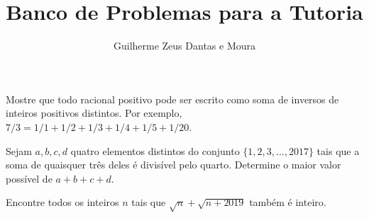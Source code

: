 \documentclass[10pt,a4paper]{scrartcl}
\title{Banco de Problemas para a Tutoria}
\author{Guilherme Zeus Dantas e Moura}
\begin{document}
	
	\zeustitle


	\begin{prob}
		Mostre que todo racional positivo pode ser escrito como soma de inversos de inteiros positivos distintos. Por exemplo, \(7/3 = 1/1 + 1/2 + 1/3 + 1/4 + 1/5 + 1/20\).
	\end{prob}
	\begin{prob}%
		Sejam $a, b, c, d$ quatro elementos distintos do conjunto $\{1,2,3, \ldots, 2017\}$ tais que a soma de quaisquer três deles é divisível pelo quarto. Determine o maior valor possível de $a+b+c+d$.
	\end{prob}
	\begin{prob}
		Encontre todos os inteiros $n$ tais que $\sqrt{n}+\sqrt{n+2019}$ também é inteiro.
	\end{prob}
\end{document}
